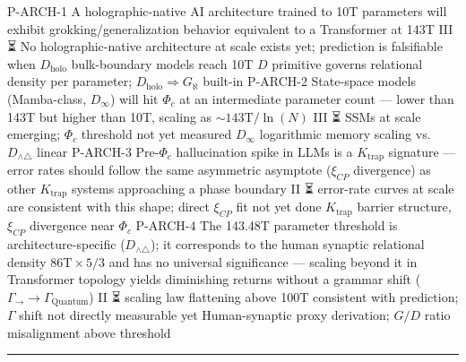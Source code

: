 \documentclass[12pt,a4paper]{article}
\begin{document}
\begin{table}[htbp]
\end{table}

\textbar{} P-ARCH-1 \textbar{} A holographic-native AI architecture trained to 10T parameters will exhibit grokking/generalization behavior equivalent to a Transformer at 143T \textbar{} III \textbar{} ⏳ No holographic-native architecture at scale exists yet; prediction is falsifiable when $D_\text{holo}$ bulk-boundary models reach 10T \textbar{} $D$ primitive governs relational density per parameter; $D_\text{holo} \Rightarrow G_\aleph$ built-in \textbar{}
\textbar{} P-ARCH-2 \textbar{} State-space models (Mamba-class, $D_\infty$) will hit $\Phi_c$ at an intermediate parameter count --- lower than 143T but higher than 10T, scaling as $\sim 143\text{T} / \ln(N)$ \textbar{} III \textbar{} ⏳ SSMs at scale emerging; $\Phi_c$ threshold not yet measured \textbar{} $D_\infty$ logarithmic memory scaling vs. $D_{\wedge\triangle}$ linear \textbar{}
\textbar{} P-ARCH-3 \textbar{} Pre-$\Phi_c$ hallucination spike in LLMs is a $K_\text{trap}$ signature --- error rates should follow the same asymmetric asymptote ($\xi_{CP}$ divergence) as other $K_\text{trap}$ systems approaching a phase boundary \textbar{} II \textbar{} ⏳ error-rate curves at scale are consistent with this shape; direct $\xi_{CP}$ fit not yet done \textbar{} $K_\text{trap}$ barrier structure, $\xi_{CP}$ divergence near $\Phi_c$ \textbar{}
\textbar{} P-ARCH-4 \textbar{} The 143.48T parameter threshold is architecture-specific ($D_{\wedge\triangle}$); it corresponds to the human synaptic relational density $86\text{T} \times 5/3$ and has no universal significance --- scaling beyond it in Transformer topology yields diminishing returns without a grammar shift ($\Gamma_\to \to \Gamma_\text{Quantum}$) \textbar{} II \textbar{} ⏳ scaling law flattening above 100T consistent with prediction; $\Gamma$ shift not directly measurable yet \textbar{} Human-synaptic proxy derivation; $G/D$ ratio misalignment above threshold \textbar{}

\begin{center}
\rule{0.5\textwidth}{0.4pt}
\end{center}
\end{document}
